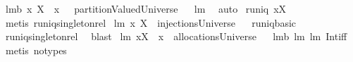 \begin{isabellebody}
\isanewline
\isanewline
{}\isamarkupfalse%
\ lm{}{}b{\isacharcolon}\ {\isachardoublequoteopen}{\isacharbraceleft}{\isacharparenleft}x{\isacharcomma}\ X{\isacharparenright}{\isacharbraceright}\ {\isacharminus}\ {\isacharbraceleft}{\isacharparenleft}x{\isacharcomma}\ {\isacharbraceleft}{\isacharbraceright}{\isacharparenright}{\isacharbraceright}\ {\isasymin}\ partitionValuedUniverse{\isachardoublequoteclose}%
\isadelimproof
\ %
\endisadelimproof
%
\isatagproof
{}\isamarkupfalse%
\ lm{}{}\ \isamarkupfalse%
\ auto%
\endisatagproof
{\isafoldproof}%
%
\isadelimproof
%
\endisadelimproof
\isanewline
\isanewline
{}\isamarkupfalse%
\ {\isachardoublequoteopen}runiq\ {\isacharbraceleft}{\isacharparenleft}x{\isacharcomma}X{\isacharparenright}{\isacharbraceright}{\isachardoublequoteclose}\ \isanewline
%
\isadelimproof
%
\endisadelimproof
%
\isatagproof
{}\isamarkupfalse%
\ {\isacharparenleft}metis\ runiq{\isacharunderscore}singleton{\isacharunderscore}rel{\isacharparenright}%
\endisatagproof
{\isafoldproof}%
%
\isadelimproof
\isanewline
%
\endisadelimproof
\isanewline
{}\isamarkupfalse%
\ lm{}{}{\isacharcolon}\ {\isachardoublequoteopen}{\isacharbraceleft}{\isacharparenleft}x{\isacharcomma}\ X{\isacharparenright}{\isacharbraceright}\ {\isasymin}\ injectionsUniverse{\isachardoublequoteclose}%
\isadelimproof
\ %
\endisadelimproof
%
\isatagproof
{}\isamarkupfalse%
\ runiq{\isacharunderscore}basic\ \isamarkupfalse%
\ runiq{\isacharunderscore}singleton{\isacharunderscore}rel\ \isamarkupfalse%
\ blast%
\endisatagproof
{\isafoldproof}%
%
\isadelimproof
%
\endisadelimproof
\isanewline
\isanewline
{}\isamarkupfalse%
\ lm{}{}{\isacharcolon}\ {\isachardoublequoteopen}{\isacharbraceleft}{\isacharparenleft}x{\isacharcomma}X{\isacharparenright}{\isacharbraceright}\ {\isacharminus}\ {\isacharbraceleft}{\isacharparenleft}x{\isacharcomma}{\isacharbraceleft}{\isacharbraceright}{\isacharparenright}{\isacharbraceright}\ {\isasymin}\ allocationsUniverse{\isachardoublequoteclose}%
\isadelimproof
\ %
\endisadelimproof
%
\isatagproof
{}\isamarkupfalse%
\ lm{}{}b\ lm{}{}\ lm{}{}\ Int{\isacharunderscore}iff\ \isamarkupfalse%
\ {\isacharparenleft}metis\ {\isacharparenleft}no{\isacharunderscore}types{\isacharparenright}{\isacharparenright}%
\endisatagproof

\end{isabellebody}
